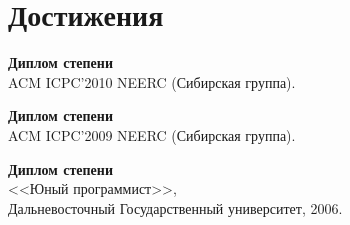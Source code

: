 \documentclass[a4paper]{article}
\begin{document}
	\section{Достижения}
	\begin{items}
		\begin{multicols}{2}
			\raggedcolumns
			\item \textbf{Диплом  степени}\\ACM ICPC'2010 NEERC (Сибирская группа).
			\item \textbf{Диплом  степени}\\ACM ICPC'2009 NEERC (Сибирская группа).
			\columnbreak
			\item \textbf{Диплом  степени}\\<<Юный программист>>,\\Дальневосточный Государственный университет, 2006.
		\end{multicols}
	\end{items}
\end{document}
